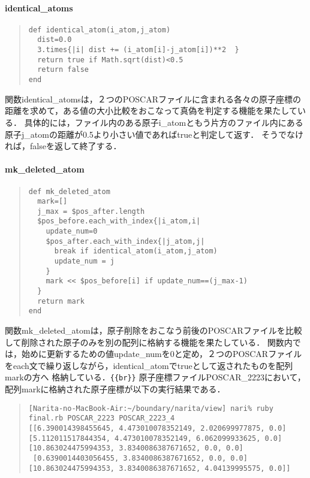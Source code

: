 \paragraph{identical\_atoms}\begin{quote}\begin{verbatim}
def identical_atom(i_atom,j_atom)
  dist=0.0
  3.times{|i| dist += (i_atom[i]-j_atom[i])**2  }
  return true if Math.sqrt(dist)<0.5
  return false
end
\end{verbatim}\end{quote}
関数identical\_atomsは，２つのPOSCARファイルに含まれる各々の原子座標の距離を求めて，ある値の大小比較をおこなって真偽を判定する機能を果たしている．
具体的には，ファイル内のある原子i\_atomともう片方のファイル内にある原子j\_atomの距離が0.5より小さい値であればtrueと判定して返す．
そうでなければ，falseを返して終了する．

\paragraph{mk\_deleted\_atom}\begin{quote}\begin{verbatim}
def mk_deleted_atom
  mark=[]
  j_max = $pos_after.length
  $pos_before.each_with_index{|i_atom,i|
    update_num=0
    $pos_after.each_with_index{|j_atom,j|
      break if identical_atom(i_atom,j_atom)
      update_num = j
    }
    mark << $pos_before[i] if update_num==(j_max-1)
  }
  return mark
end
\end{verbatim}\end{quote}
関数mk\_deleted\_atomは，原子削除をおこなう前後のPOSCARファイルを比較して削除された原子のみを別の配列に格納する機能を果たしている．
関数内では，始めに更新するための値update\_numを0と定め，２つのPOSCARファイルをeach文で繰り返しながら，identical\_atomでtrueとして返されたものを配列markの方へ
格納している．\verb|{{br}}|
原子座標ファイルPOSCAR\_2223において，配列markに格納された原子座標が以下の実行結果である．
\begin{quote}\begin{verbatim}
[Narita-no-MacBook-Air:~/boundary/narita/view] nari% ruby final.rb POSCAR_2223 POSCAR_2223_4
[[6.390014398455645, 4.473010078352149, 2.020699977875, 0.0] 
[5.112011517844354, 4.473010078352149, 6.062099933625, 0.0] 
[10.863024475994353, 3.8340086387671652, 0.0, 0.0]
 [0.6390014403056455, 3.8340086387671652, 0.0, 0.0] 
[10.863024475994353, 3.8340086387671652, 4.04139995575, 0.0]]
\end{verbatim}\end{quote}
